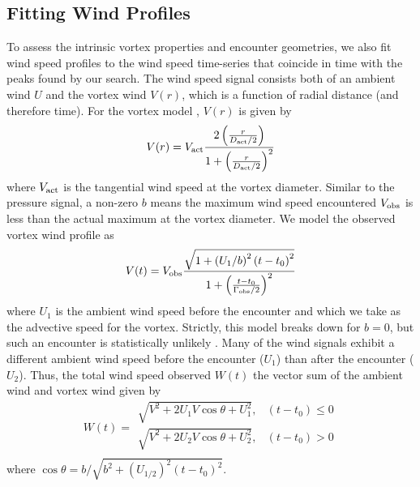 \documentclass[linenumbers,trackchanges]{aastex63}
\begin{document}
\subsection{Fitting Wind Profiles}
\label{sec:Fitting Wind Profiles}
To assess the intrinsic vortex properties and encounter geometries, we also fit wind speed profiles to the wind speed time-series that coincide in time with the peaks found by our search. The wind speed signal consists both of an ambient wind $U$ and the vortex wind $V(r)$, which is a function of radial distance (and therefore time). For the  vortex model \citep{1991ExFl...11...73V}, $V(r)$ is given by
\begin{equation}
    V(r) = V_{\rm act} \frac{2 \left( \frac{r}{D_{\rm act}/2} \right) }{1 + \left( \frac{r}{D_{\rm act}/2} \right)^2}
\end{equation}
where $V_{\rm act}$ is the tangential wind speed at the vortex diameter. Similar to the pressure signal, a non-zero $b$ means the maximum wind speed encountered $V_{\rm obs}$ is less than the actual maximum at the vortex diameter. We model the observed vortex wind profile as
\begin{equation}
    V(t) = V_{\rm obs} \frac{\sqrt{1 + \left( U_1/b \right)^2 \left( t - t_0 \right)^2}}{1 + \left(\frac{t - t_0}{\Gamma_{\rm obs}/2}\right)^2}\label{eqn:wind_profile}
\end{equation}
where $U_1$ is the ambient wind speed before the encounter and which we take as the advective speed for the vortex. Strictly, this model breaks down for $b = 0$, but such an encounter is statistically unlikely \citep{2018Icar..299..166J}. Many of the wind signals exhibit a different ambient wind speed before the encounter ($U_1$) than after the encounter ($U_2$). Thus, the total wind speed observed $W(t)$  the vector sum of the ambient wind and vortex wind given by 
\begin{equation}
    W(t) = 
    \begin{array}{ll}
            \sqrt{V^2 + 2 U_1 V \cos \theta + U_1^2}, & \left( t - t_0 \right) \leq 0\\
            \sqrt{V^2 + 2 U_2 V \cos \theta + U_2^2}, & \left( t - t_0 \right) > 0\\
    \end{array} \label{eqn:total_wind_speed}
\end{equation}
where $\cos \theta = b/\sqrt{b^2 + \left( U_{1/2} \right)^2\left( t - t_0 \right)^2}$. 
\end{document}
